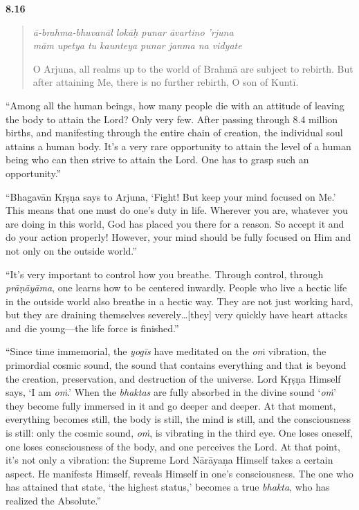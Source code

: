 \par\noindent\textbf{8.16}\par
\begin{verse}
\textit{ā-brahma-bhuvanāl lokāḥ punar āvartino ’rjuna} \\
\textit{mām upetya tu kaunteya punar janma na vidyate}

\noindent O Arjuna, all realms up to the world of Brahmā are subject to rebirth. But after attaining Me, there is no further rebirth, O son of Kuntī.
\end{verse}
\par


\enquote{Among all the human beings, how many people die with an attitude of leaving the body to attain the Lord? Only very few. After passing through 8.4 million births, and manifesting through the entire chain of creation, the individual soul attains a human body. It’s a very rare opportunity to attain the level of a human being who can then strive to attain the Lord. One has to grasp such an opportunity.}

\enquote{Bhagavān Kṛṣṇa says to Arjuna, \enquote{Fight! But keep your mind focused on Me.} This means that one must do one’s duty in life. Wherever you are, whatever you are doing in this world, God has placed you there for a reason. So accept it and do your action properly! However, your mind should be fully focused on Him and not only on the outside world.}

\enquote{It’s very important to control how you breathe. Through control, through \textit{prāṇāyāma}, one learns how to be centered inwardly. People who live a hectic life in the outside world also breathe in a hectic way. They are not just working hard, but they are draining themselves severely\ldots [they] very quickly have heart attacks and die young---the life force is finished.}

\enquote{Since time immemorial, the \textit{yogīs} have meditated on the \textit{oṁ} vibration, the primordial cosmic sound, the sound that contains everything and that is beyond the creation, preservation, and destruction of the universe. Lord Kṛṣṇa Himself says, \enquote{I am \textit{oṁ}.} When the \textit{bhaktas} are fully absorbed in the divine sound \enquote{\textit{oṁ}} they become fully immersed in it and go deeper and deeper. At that moment, everything becomes still, the body is still, the mind is still, and the consciousness is still: only the cosmic sound, \textit{oṁ}, is vibrating in the third eye. One loses oneself, one loses consciousness of the body, and one perceives the Lord. At that point, it’s not only a vibration: the Supreme Lord Nārāyaṇa Himself takes a certain aspect. He manifests Himself, reveals Himself in one’s consciousness. The one who has attained that state, \enquote{the highest status,} becomes a true \textit{bhakta}, who has realized the Absolute.}

